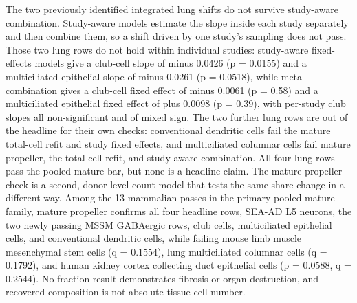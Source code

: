 \documentclass[11pt]{article}
\begin{document}
The two previously identified integrated lung shifts do not survive study-aware combination. Study-aware models estimate the slope inside each study separately and then combine them, so a shift driven by one study's sampling does not pass. Those two lung rows do not hold within individual studies: study-aware fixed-effects models give a club-cell slope of minus 0.0426 (p = 0.0155) and a multiciliated epithelial slope of minus 0.0261 (p = 0.0518), while meta-combination gives a club-cell fixed effect of minus 0.0061 (p = 0.58) and a multiciliated epithelial fixed effect of plus 0.0098 (p = 0.39), with per-study club slopes all non-significant and of mixed sign. The two further lung rows are out of the headline for their own checks: conventional dendritic cells fail the mature total-cell refit and study fixed effects, and multiciliated columnar cells fail mature propeller, the total-cell refit, and study-aware combination. All four lung rows pass the pooled mature bar, but none is a headline claim. The mature propeller check is a second, donor-level count model that tests the same share change in a different way. Among the 13 mammalian passes in the primary pooled mature family, mature propeller confirms all four headline rows, SEA-AD L5 neurons, the two newly passing MSSM GABAergic rows, club cells, multiciliated epithelial cells, and conventional dendritic cells, while failing mouse limb muscle mesenchymal stem cells (q = 0.1554), lung multiciliated columnar cells (q = 0.1792), and human kidney cortex collecting duct epithelial cells (p = 0.0588, q = 0.2544). No fraction result demonstrates fibrosis or organ destruction, and recovered composition is not absolute tissue cell number.
\end{document}
